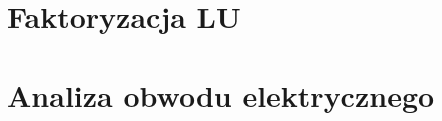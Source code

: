 \documentclass{article}
\begin{document}
    \section{Faktoryzacja LU}
        
    \section{Analiza obwodu elektrycznego}


    
\end{document}
